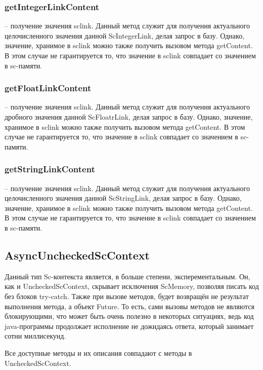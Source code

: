 \subsubsection {getIntegerLinkContent} -- получение значения sclink. Данный метод служит для получения актуального целочисленного значения данной ScIntegerLink, делая запрос в базу. Однако, значение, хранимое в sclink можно также получить вызовом метода getContent. В этом случае не гарантируется то, что значение в sclink совпадает со значением в sc-памяти.
\subsubsection {getFloatLinkContent} -- получение значения sclink. Данный метод служит для получения актуального дробного значения данной ScFloatrLink, делая запрос в базу. Однако, значение, хранимое в sclink можно также получить вызовом метода getContent. В этом случае не гарантируется то, что значение в sclink совпадает со значением в sc-памяти.
\subsubsection {getStringLinkContent} -- получение значения sclink. Данный метод служит для получения актуального целочисленного значения данной ScStringLink, делая запрос в базу. Однако, значение, хранимое в sclink можно также получить вызовом метода getContent. В этом случае не гарантируется то, что значение в sclink совпадает со значением в sc-памяти.


\subsection{AsyncUncheckedScContext}
Данный тип Sc-контекста является, в больше степени, эксперементальным. Он, как и UncheckedScContext, скрывает исключения ScMemory, позволяя писать код без блоков try-catch. Также при вызове методов, будет возвращён не результат выполнения метода, а объект Future. То есть, сами вызовы методов не являются блокирующими, что может быть очень полезно в некоторых ситуациях, ведь код java-программы продолжает исполнение не дожидаясь ответа, который занимает сотни миллисекунд. 

Все доступные методы и их описания совпадают с методы в UncheckedScContext. 